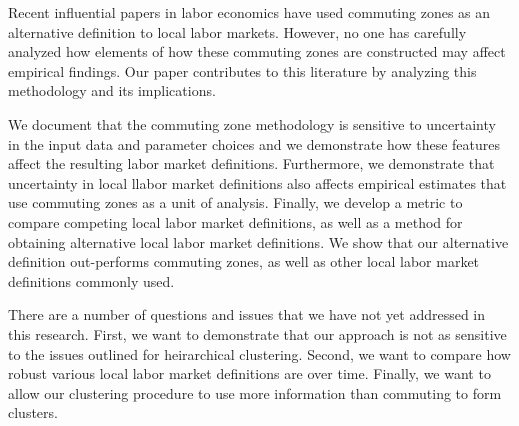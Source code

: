 Recent influential papers in labor economics have used commuting zones as an alternative definition to local labor markets. However, no one has carefully analyzed how elements of how these commuting zones are constructed may affect empirical findings. Our paper contributes to this literature by analyzing this methodology and its implications. 

We document that the commuting zone methodology is sensitive to uncertainty in the input data and parameter choices and we demonstrate how these features affect the resulting labor market definitions. Furthermore, we demonstrate that uncertainty in local llabor market definitions also affects empirical estimates that use commuting zones as a unit of analysis. Finally, we develop a metric to compare competing local labor market definitions, as well as a method for obtaining alternative local labor market definitions. We show that our alternative definition out-performs commuting zones, as well as other local labor market definitions commonly used.

There are a number of questions and issues that we have not yet addressed in this research. First, we want to demonstrate that our approach is not as sensitive to the issues outlined for heirarchical clustering. Second, we want to compare how robust various local labor market definitions are over time. Finally, we want to allow our clustering procedure to use more information than commuting to form clusters. 
